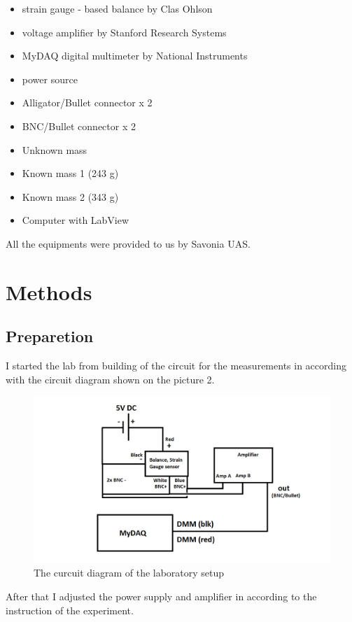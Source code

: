 \documentclass[english]{article}
\begin{document}
\begin{itemize}
\item strain gauge - based balance by Clas Ohlson
\item voltage amplifier by Stanford Research Systems
\item MyDAQ digital multimeter by National Instruments
\item power source
\item Alligator/Bullet connector x 2
\item BNC/Bullet connector x 2
\item Unknown mass
\item Known mass 1 (243 g) 
\item Known mass 2 (343 g)
\item Computer with LabView
\end{itemize}

All the equipments were provided to us by Savonia UAS.\cite{sv}

\section{Methods}

\subsection{Preparetion}
I started the lab from building of the circuit for the measurements in according with the circuit diagram shown on the picture 2.

\begin{figure}[H]
\centerline{\includegraphics[scale=0.5]{labview/circuit}}
\caption{The curcuit diagram of the laboratory setup\cite{sv}}
\end{figure}

After that I adjusted the power supply and amplifier in according to the instruction of the experiment.\\
\end{document}
